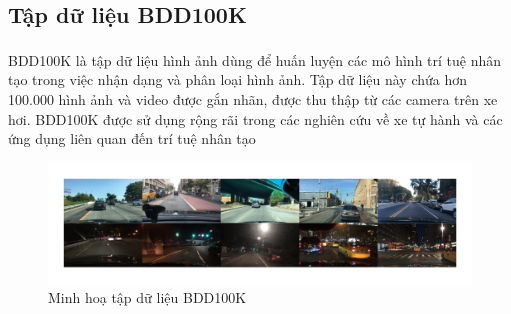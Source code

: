 \subsection{Tập dữ liệu BDD100K}
\tab BDD100K\textsuperscript{\cite{bdd100k}} là tập dữ liệu hình ảnh dùng để huấn luyện các mô hình trí tuệ nhân tạo trong việc nhận dạng và phân loại hình ảnh. Tập dữ liệu này chứa hơn 100.000 hình ảnh và video được gắn nhãn, được thu thập từ các camera trên xe hơi. BDD100K được sử dụng rộng rãi trong các nghiên cứu về xe tự hành và các ứng dụng liên quan đến trí tuệ nhân tạo
\begin{figure}[!hbt]
\begin{center}
    \includegraphics[width=16.5cm]{img/2_Theory/bdd100k.png}
    \caption{Minh hoạ tập dữ liệu BDD100K}
\end{center}
\end{figure}\\
